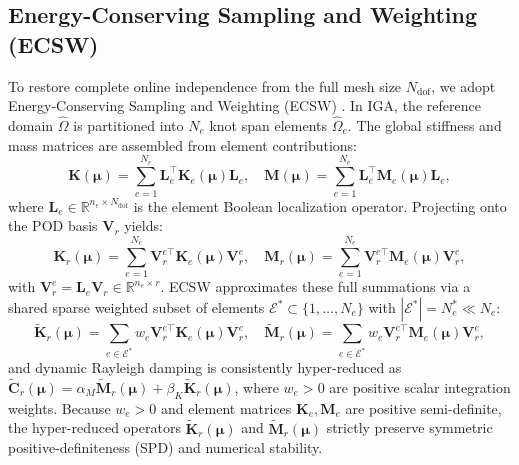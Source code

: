 \subsection{Energy-Conserving Sampling and Weighting (ECSW)}
\label{subsec:ecsw_formulation}
To restore complete online independence from the full mesh size $N_{\text{dof}}$, we adopt Energy-Conserving Sampling and Weighting (ECSW) \cite{Farhat2014, farhat2015, Maierhofer2022}. In IGA, the reference domain $\hat{\Omega}$ is partitioned into $N_e$ knot span elements $\hat{\Omega}_e$. The global stiffness and mass matrices are assembled from element contributions:
\begin{equation}
    \bm{K}(\bm{\mu}) = \sum_{e=1}^{N_e} \bm{L}_e^\top \bm{K}_e(\bm{\mu}) \bm{L}_e, \quad \bm{M}(\bm{\mu}) = \sum_{e=1}^{N_e} \bm{L}_e^\top \bm{M}_e(\bm{\mu}) \bm{L}_e,
\end{equation}
where $\bm{L}_e \in \mathbb{R}^{n_e \times N_{\text{dof}}}$ is the element Boolean localization operator. Projecting onto the POD basis $\bm{V}_r$ yields:
\begin{equation}
    \bm{K}_r(\bm{\mu}) = \sum_{e=1}^{N_e} \bm{V}_r^{e\top} \bm{K}_e(\bm{\mu}) \bm{V}_r^e, \quad \bm{M}_r(\bm{\mu}) = \sum_{e=1}^{N_e} \bm{V}_r^{e\top} \bm{M}_e(\bm{\mu}) \bm{V}_r^e,
\end{equation}
with $\bm{V}_r^e = \bm{L}_e \bm{V}_r \in \mathbb{R}^{n_e \times r}$. ECSW approximates these full summations via a shared sparse weighted subset of elements $\mathcal{E}^* \subset \{1, \dots, N_e\}$ with $|\mathcal{E}^*| = N_e^* \ll N_e$:
\begin{equation}
    \tilde{\bm{K}}_r(\bm{\mu}) = \sum_{e \in \mathcal{E}^*} w_e \bm{V}_r^{e\top} \bm{K}_e(\bm{\mu}) \bm{V}_r^e, \quad \tilde{\bm{M}}_r(\bm{\mu}) = \sum_{e \in \mathcal{E}^*} w_e \bm{V}_r^{e\top} \bm{M}_e(\bm{\mu}) \bm{V}_r^e,
    \label{eq:ecsw_stiffness}
\end{equation}
and dynamic Rayleigh damping is consistently hyper-reduced as $\tilde{\bm{C}}_r(\bm{\mu}) = \alpha_M \tilde{\bm{M}}_r(\bm{\mu}) + \beta_K \tilde{\bm{K}}_r(\bm{\mu})$, where $w_e > 0$ are positive scalar integration weights. Because $w_e > 0$ and element matrices $\bm{K}_e, \bm{M}_e$ are positive semi-definite, the hyper-reduced operators $\tilde{\bm{K}}_r(\bm{\mu})$ and $\tilde{\bm{M}}_r(\bm{\mu})$ strictly preserve symmetric positive-definiteness (SPD) and numerical stability.

